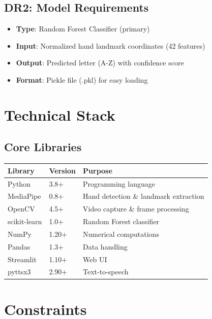 \subsection{DR2: Model Requirements}
\begin{itemize}
    \item \textbf{Type}: Random Forest Classifier (primary)
    \item \textbf{Input}: Normalized hand landmark coordinates (42 features)
    \item \textbf{Output}: Predicted letter (A-Z) with confidence score
    \item \textbf{Format}: Pickle file (.pkl) for easy loading
\end{itemize}

\vspace{1em}
\section{Technical Stack}

\subsection{Core Libraries}
\begin{table}[H]
\centering
\begin{tabular}{|L{2cm}|C{2cm}|L{5cm}|}
\hline
\textbf{Library} & \textbf{Version} & \textbf{Purpose} \\
\hline
Python & 3.8+ & Programming language \\
\hline
MediaPipe & 0.8+ & Hand detection \& landmark extraction \\
\hline
OpenCV & 4.5+ & Video capture \& frame processing \\
\hline
scikit-learn & 1.0+ & Random Forest classifier \\
\hline
NumPy & 1.20+ & Numerical computations \\
\hline
Pandas & 1.3+ & Data handling \\
\hline
Streamlit & 1.10+ & Web UI \\
\hline
pyttsx3 & 2.90+ & Text-to-speech \\
\hline
\end{tabular}
\end{table}

\vspace{1em}
\section{Constraints}

